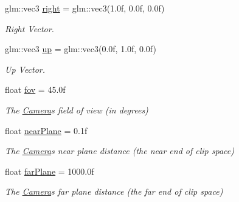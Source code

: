 \begin{DoxyCompactItemize}
\mbox{\label{class_camera_aebffcc6289dd99df7554b18d00a81161}} 
glm\+::vec3 \mbox{\hyperlink{class_camera_aebffcc6289dd99df7554b18d00a81161}{right}} = glm\+::vec3(1.\+0f, 0.\+0f, 0.\+0f)
\begin{DoxyCompactList}\small\item\em Right Vector. \end{DoxyCompactList}\item 
\mbox{\label{class_camera_a3fe5f351380fb118ffc600591769f049}} 
glm\+::vec3 \mbox{\hyperlink{class_camera_a3fe5f351380fb118ffc600591769f049}{up}} = glm\+::vec3(0.\+0f, 1.\+0f, 0.\+0f)
\begin{DoxyCompactList}\small\item\em Up Vector. \end{DoxyCompactList}\item 
\mbox{\label{class_camera_aff7393c9cfbccd7e369091f00008da93}} 
float \mbox{\hyperlink{class_camera_aff7393c9cfbccd7e369091f00008da93}{fov}} = 45.\+0f
\begin{DoxyCompactList}\small\item\em The \mbox{\hyperlink{class_camera}{Camera}}\textquotesingle{}s field of view (in degrees) \end{DoxyCompactList}\item 
\mbox{\label{class_camera_a78d8722a95e4f7770d79c950bda2bfdc}} 
float \mbox{\hyperlink{class_camera_a78d8722a95e4f7770d79c950bda2bfdc}{near\+Plane}} = 0.\+1f
\begin{DoxyCompactList}\small\item\em The \mbox{\hyperlink{class_camera}{Camera}}\textquotesingle{}s near plane distance (the near end of clip space) \end{DoxyCompactList}\item 
\mbox{\label{class_camera_a8e8436cced3a180e13bfafa0791fb82a}} 
float \mbox{\hyperlink{class_camera_a8e8436cced3a180e13bfafa0791fb82a}{far\+Plane}} = 1000.\+0f
\begin{DoxyCompactList}\small\item\em The \mbox{\hyperlink{class_camera}{Camera}}\textquotesingle{}s far plane distance (the far end of clip space) \end{DoxyCompactList}\end{DoxyCompactItemize}


